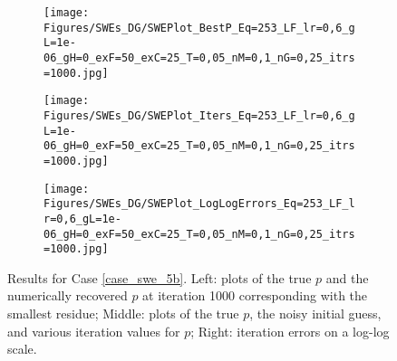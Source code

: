\begin{figure}[h]
    \begin{subfigure}[t]{0.32\textwidth}
        \centering
        \texttt{[image: Figures/SWEs\_DG/SWEPlot\_BestP\_Eq=253\_LF\_lr=0,6\_gL=1e-06\_gH=0\_exF=50\_exC=25\_T=0,05\_nM=0,1\_nG=0,25\_itrs=1000.jpg]}
    \end{subfigure}
    \begin{subfigure}[t]{0.32\textwidth}
        \centering
        \texttt{[image: Figures/SWEs\_DG/SWEPlot\_Iters\_Eq=253\_LF\_lr=0,6\_gL=1e-06\_gH=0\_exF=50\_exC=25\_T=0,05\_nM=0,1\_nG=0,25\_itrs=1000.jpg]}
    \end{subfigure}
    \begin{subfigure}[t]{0.32\textwidth}
        \texttt{[image: Figures/SWEs\_DG/SWEPlot\_LogLogErrors\_Eq=253\_LF\_lr=0,6\_gL=1e-06\_gH=0\_exF=50\_exC=25\_T=0,05\_nM=0,1\_nG=0,25\_itrs=1000.jpg]}
    \end{subfigure}
    \caption{Results for Case \eqref{case_swe_5b}. 
    Left: plots of the true $p$ and the numerically recovered $p$ at iteration 1000 corresponding with the smallest residue; Middle: plots of the true $p$, the noisy initial guess, and various iteration values for $p$; Right: iteration errors on a log-log scale.}
    \label{fig:swe_5B}
\end{figure}

